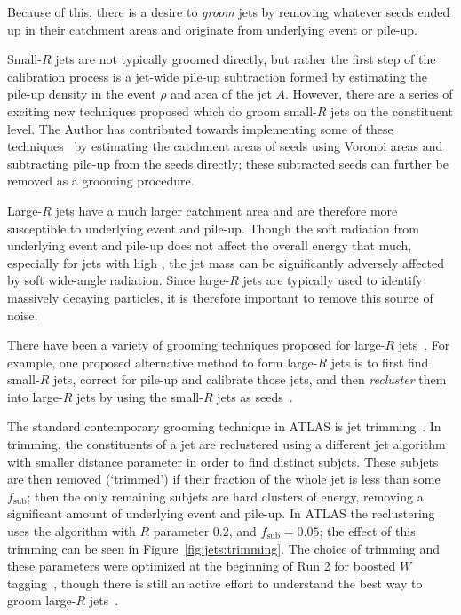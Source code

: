 Because of this, there is a desire to \textit{groom} jets by removing whatever seeds ended up in their catchment areas and originate from underlying event or pile-up.

Small-$R$ jets are not typically groomed directly, but rather the first step of the calibration process is a jet-wide pile-up subtraction formed by estimating the pile-up density in the event $\rho$ and area of the jet $A$.
However, there are a series of exciting new techniques proposed which do groom small-$R$ jets on the constituent level.
The Author has contributed towards implementing some of these techniques~\cite{ATLAS-CONF-2017-065} by estimating the catchment areas of seeds using Voronoi areas and subtracting pile-up from the seeds directly; these subtracted seeds can further be removed as a grooming procedure.

Large-$R$ jets have a much larger catchment area and are therefore more susceptible to underlying event and pile-up.
Though the soft radiation from underlying event and pile-up does not affect the overall energy that much, especially for jets with high \pt{}, the jet mass can be significantly adversely affected by soft wide-angle radiation.
Since large-$R$ jets are typically used to identify massively decaying particles, it is therefore important to remove this source of noise.

There have been a variety of grooming techniques proposed for large-$R$ jets~\cite{Aad:2013gja}.
For example, one proposed alternative method to form large-$R$ jets is to first find small-$R$ jets, correct for pile-up and calibrate those jets, and then \textit{recluster} them into large-$R$ jets by using the small-$R$ jets as seeds~\cite{Nachman:2014kla}.

The standard contemporary grooming technique in ATLAS is jet trimming~\cite{Krohn:2009th}.
In trimming, the constituents of a jet are reclustered using a different jet algorithm with smaller distance parameter in order to find distinct subjets.
These subjets are then removed (`trimmed') if their \pt{} fraction of the whole jet is less than some $f_\text{sub}$; then the only remaining subjets are hard clusters of energy, removing a significant amount of underlying event and pile-up.
In ATLAS the reclustering uses the \kt{} algorithm with $R$ parameter $0.2$, and $f_\text{sub}=0.05$; the effect of this trimming can be seen in Figure~\ref{fig:jets:trimming}.
The choice of trimming and these parameters were optimized at the beginning of Run 2 for boosted $W$ tagging~\cite{ATL-PHYS-PUB-2014-004}, though there is still an active effort to understand the best way to groom large-$R$ jets~\cite{ATL-PHYS-PUB-2019-027}.

